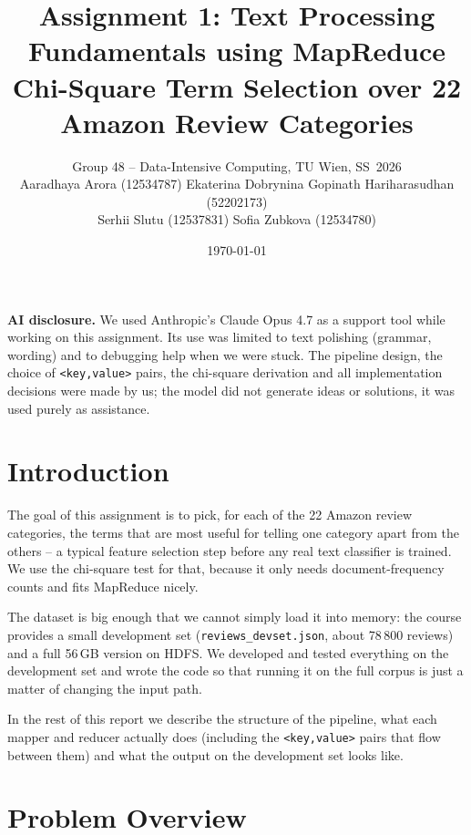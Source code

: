 \documentclass[11pt,a4paper]{article}
\title{\vspace{-1cm}Assignment 1: Text Processing Fundamentals using MapReduce\\
       \large Chi-Square Term Selection over 22 Amazon Review Categories}
\author{
Group 48 -- Data-Intensive Computing, TU Wien, SS~2026\\[2pt]
\small
Aaradhaya Arora (12534787) \quad
Ekaterina Dobrynina \quad
Gopinath Hariharasudhan (52202173) \\[1pt]
\small
Serhii Slutu (12537831) \quad
Sofia Zubkova (12534780)
}
\date{\today}
\begin{document}
\maketitle

\vspace{-0.4cm}

\noindent\textbf{AI disclosure.}
We used Anthropic's Claude Opus 4.7 as a support tool while working on this
assignment. Its use was limited to text polishing (grammar, wording) and to
debugging help when we were stuck. The pipeline design, the choice of
\texttt{<key,value>} pairs, the chi-square derivation and all
implementation decisions were made by us; the model did not generate ideas
or solutions, it was used purely as assistance.

\vspace{0.2cm}

\section{Introduction}

The goal of this assignment is to pick, for each of the 22 Amazon review
categories, the terms that are most useful for telling one category apart
from the others -- a typical feature selection step before any real text
classifier is trained. We use the chi-square test for that, because it
only needs document-frequency counts and fits MapReduce nicely.

The dataset is big enough that we cannot simply load it into memory: the
course provides a small development set (\texttt{reviews\_devset.json},
about 78\,800 reviews) and a full 56\,GB version on HDFS. We developed
and tested everything on the development set and wrote the code so that
running it on the full corpus is just a matter of changing the input
path.

In the rest of this report we describe the structure of the pipeline,
what each mapper and reducer actually does (including the
\texttt{<key,value>} pairs that flow between them) and what the output
on the development set looks like.

\section{Problem Overview}
\end{document}
